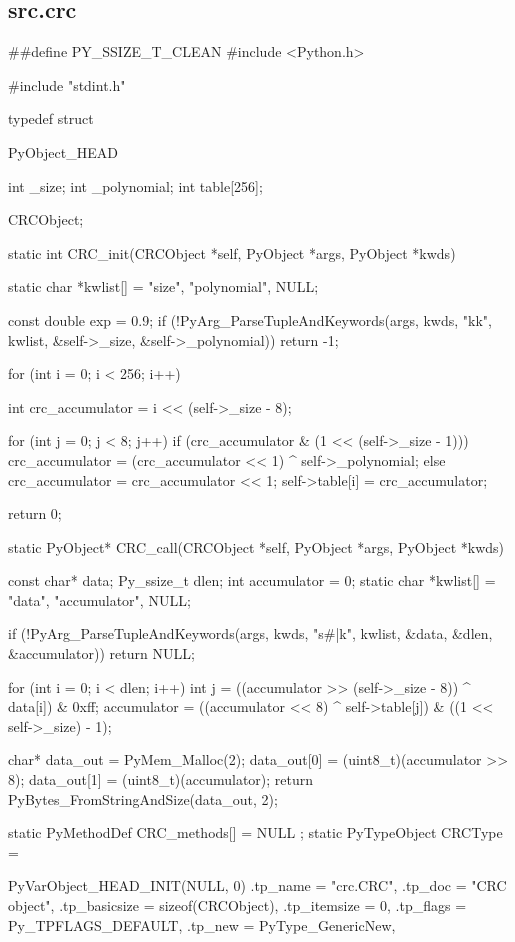 \subsection{src.crc}
\begin{pythoncode}
\##define PY\_SSIZE\_T\_CLEAN
#include <Python.h>

#include "stdint.h"


typedef struct {
    PyObject_HEAD

    int _size;
    int _polynomial;
    int table[256];
} CRCObject;

static int CRC_init(CRCObject *self, PyObject *args, PyObject *kwds) {
    static char *kwlist[] = {"size", "polynomial", NULL};

    const double exp = 0.9;
    if (!PyArg_ParseTupleAndKeywords(args, kwds, "kk", kwlist,
                                     &self->_size, &self->_polynomial))
        return -1;
    
    for (int i = 0; i < 256; i++) {
        int crc_accumulator = i << (self->_size - 8);

        for (int j = 0; j < 8; j++) {
            if (crc_accumulator & (1 << (self->_size - 1)))
                crc_accumulator = (crc_accumulator << 1) ^ self->_polynomial;
            else
                crc_accumulator = crc_accumulator << 1;
        }
        self->table[i] = crc_accumulator;
    }

    return 0;
}

static PyObject* CRC_call(CRCObject *self, PyObject *args, PyObject *kwds) {
    const char* data;
    Py_ssize_t dlen;
    int accumulator = 0;
    static char *kwlist[] = {"data", "accumulator", NULL};

    if (!PyArg_ParseTupleAndKeywords(args, kwds, "s#|k", kwlist,
                                     &data, &dlen, &accumulator))
        return NULL;

    for (int i = 0; i < dlen; i++) {
        int j = ((accumulator >> (self->_size - 8)) ^ data[i]) & 0xff;
        accumulator = ((accumulator << 8) ^ self->table[j]) & ((1 << self->_size) - 1);
    }

    char* data_out = PyMem_Malloc(2);
    data_out[0] = (uint8_t)(accumulator >> 8);
    data_out[1] = (uint8_t)(accumulator);
    return PyBytes_FromStringAndSize(data_out, 2);
}

static PyMethodDef CRC_methods[] = {
    {NULL}
};
static PyTypeObject CRCType = {
    PyVarObject_HEAD_INIT(NULL, 0)
    .tp_name = "crc.CRC",
    .tp_doc = "CRC object",
    .tp_basicsize = sizeof(CRCObject),
    .tp_itemsize = 0,
    .tp_flags = Py_TPFLAGS_DEFAULT,
    .tp_new = PyType_GenericNew,

}
\end{pythoncode}
